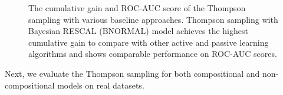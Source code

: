 \begin{figure}[t]
	\centering
	
	\caption{\label{fig:c_gain}The cumulative gain and ROC-AUC score of the Thompson sampling 
	with various baseline approaches. Thompson sampling with Bayesian RESCAL (BNORMAL)
	model achieves the highest cumulative gain to compare with other active and 
	passive learning algorithms and shows comparable performance on ROC-AUC scores.}
\end{figure}

Next, we evaluate the Thompson sampling for both compositional and non-compositional models on real datasets.

